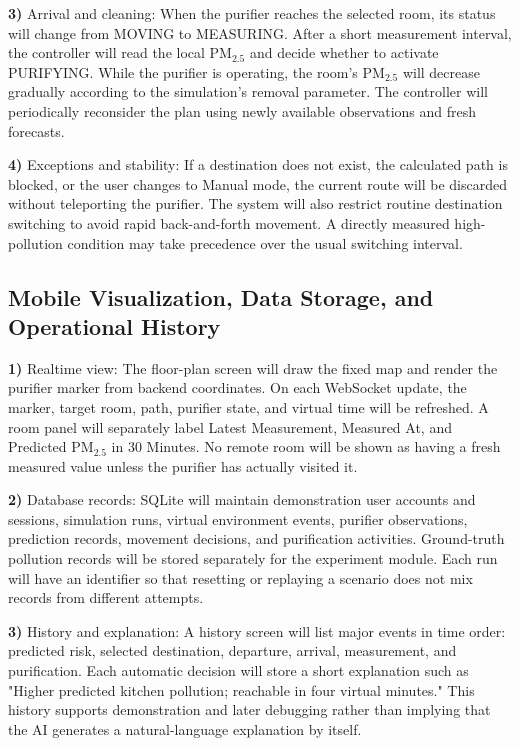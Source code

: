 \documentclass[conference]{IEEEtran}
\begin{document}
\par\noindent\textbf{3)} Arrival and cleaning:
When the purifier reaches the selected room, its status will change from MOVING to MEASURING. After a short measurement interval, the controller will read the local PM$_{2.5}$ and decide whether to activate PURIFYING. While the purifier is operating, the room's PM$_{2.5}$ will decrease gradually according to the simulation's removal parameter. The controller will periodically reconsider the plan using newly available observations and fresh forecasts.

\par\noindent\textbf{4)} Exceptions and stability:
If a destination does not exist, the calculated path is blocked, or the user changes to Manual mode, the current route will be discarded without teleporting the purifier. The system will also restrict routine destination switching to avoid rapid back-and-forth movement. A directly measured high-pollution condition may take precedence over the usual switching interval.

\subsection{Mobile Visualization, Data Storage, and Operational History}
\par\noindent\textbf{1)} Realtime view:
The floor-plan screen will draw the fixed map and render the purifier marker from backend coordinates. On each WebSocket update, the marker, target room, path, purifier state, and virtual time will be refreshed. A room panel will separately label Latest Measurement, Measured At, and Predicted PM$_{2.5}$ in 30 Minutes. No remote room will be shown as having a fresh measured value unless the purifier has actually visited it.

\par\noindent\textbf{2)} Database records:
SQLite will maintain demonstration user accounts and sessions, simulation runs, virtual environment events, purifier observations, prediction records, movement decisions, and purification activities. Ground-truth pollution records will be stored separately for the experiment module. Each run will have an identifier so that resetting or replaying a scenario does not mix records from different attempts.

\par\noindent\textbf{3)} History and explanation:
A history screen will list major events in time order: predicted risk, selected destination, departure, arrival, measurement, and purification. Each automatic decision will store a short explanation such as "Higher predicted kitchen pollution; reachable in four virtual minutes." This history supports demonstration and later debugging rather than implying that the AI generates a natural-language explanation by itself.
\end{document}
